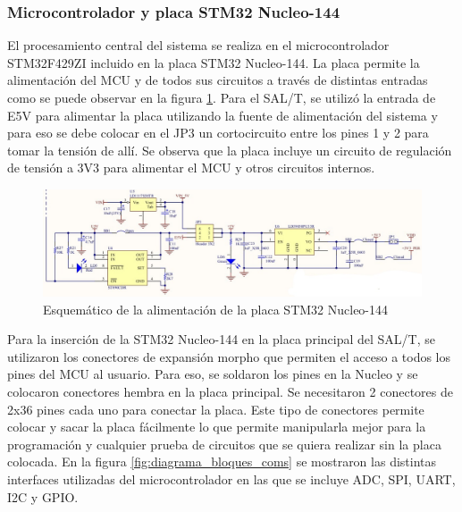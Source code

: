 \subsubsection{Microcontrolador y placa STM32 Nucleo-144}

El procesamiento central del sistema se realiza en el microcontrolador STM32F429ZI incluido en la placa STM32 Nucleo-144. La placa permite la alimentación del MCU y de todos sus circuitos a través de distintas entradas como se puede observar en la figura \ref{fig:nucleo_pw}. Para el SAL/T, se utilizó la entrada de E5V para alimentar la placa utilizando la fuente de alimentación del sistema y para eso se debe colocar en el JP3 un cortocircuito entre los pines 1 y 2 para tomar la tensión de allí. Se observa que la placa incluye un circuito de regulación de tensión a 3V3 para alimentar el MCU y otros circuitos internos. 


\begin{figure}[H]
    \centering
    \includegraphics[width = \linewidth]{img/nucleo_pw.jpeg}
    \caption{Esquemático de la alimentación de la placa STM32 Nucleo-144}
    \label{fig:nucleo_pw}
\end{figure}    

Para la inserción de la STM32 Nucleo-144 en la placa principal del SAL/T, se utilizaron los conectores de expansión morpho que permiten el acceso a todos los pines del MCU al usuario. Para eso, se soldaron los pines en la Nucleo y se colocaron conectores hembra en la placa principal. Se necesitaron 2 conectores de 2x36 pines cada uno para conectar la placa. Este tipo de conectores permite colocar y sacar la placa fácilmente lo que permite manipularla mejor para la programación y cualquier prueba de circuitos que se quiera realizar sin la placa colocada. En la figura \ref{fig:diagrama_bloques_coms} se mostraron las distintas interfaces utilizadas del microcontrolador en las que se incluye ADC, SPI, UART, I2C y GPIO. 